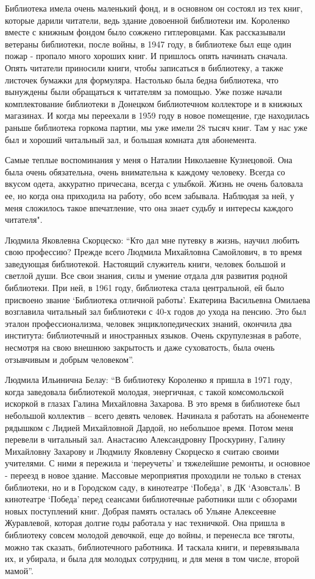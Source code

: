 Библиотека имела очень маленький фонд, и в основном он состоял из тех книг,
которые дарили читатели, ведь здание довоенной библиотеки им. Короленко вместе
с книжным фондом было сожжено гитлеровцами. Как рассказывали ветераны
библиотеки, после войны, в 1947 году, в библиотеке был еще один пожар - пропало
много хо­роших книг. И пришлось  опять начинать сначала. Опять читатели
приносили книги, чтобы записаться в библиотеку, а также листочек бумажки для
формуляра.  Настолько была бедна библиотека, что вынуждены были обращаться к
читателям за помощью. Уже позже начали комплектование библиотеки в Донецком
библиотечном коллекторе и в книжных магазинах. И когда мы переехали в 1959 году
в новое помещение, где находилась раньше библиотека горкома партии, мы уже
имели 28 тысяч книг. Там у нас уже был и хороший читальный зал, и большая
комната для абонемента.

Самые теплые воспоминания у меня о Наталии Николаевне Кузнецовой. Она была
очень обязательна, очень внимательна к каждому человеку. Всегда со вкусом
одета, аккуратно причесана, всегда с улыбкой. Жизнь не очень баловала ее, но
когда она приходила на работу, обо всем забывала. Наблюдая за ней, у меня
сложилось такое впечатление, что она знает судьбу и интересы каждого читателя".

Людмила Яковлевна Скорцеско: \enquote{Кто дал мне путевку в жизнь, научил любить свою
профессию? Прежде всего Людмила Михайловна Самойлович, в то время заведующая
библиотекой. Настоящий служитель книги, чело­век большой и светлой души. Все
свои знания, силы и умение отдала для развития родной библиотеки. При ней, в
1961 году, библиотека стала центральной, ей было присвоено звание \enquote{Библиотека
отличной работы}. Екатерина Васильевна Омилаева возглавила читальный зал
библиотеки с 40-х годов до ухода на пенсию. Это был эталон профессионализма,
человек энциклопедических знаний, окончила два института: библиотечный и
иностранных языков. Очень скрупулезная в работе, несмотря на свою внешнюю
закрытость и даже суховатость, была очень отзывчивым и добрым человеком}.

Людмила Ильинична Белау: \enquote{В библиотеку Короленко я пришла в 1971 году, когда
заведовала библиотекой молодая, энергичная, с такой комсомольской искоркой в
глазах Галина Михайловна Захарова. В это время в библиотеке был небольшой
коллектив – всего девять человек. Начинала я работать на абонементе рядышком с
Лидией Михайловной Дардой, но небольшое время. Потом меня перевели в читальный
зал. Анастасию Александровну Проскурину, Галину Михайловну Захарову и Людмилу
Яковлевну Скорцеско я считаю своими учителями. С ними я пережила и \enquote{переучеты}
и тяжелей­шие ремонты, и основное - переезд в новое здание. Массовые
мероприятия проходили не только в стенах библиотеки, но и в Городском  саду, в
кинотеатре \enquote{Победа}, в ДК \enquote{Азовсталь}. В кинотеатре \enquote{Победа} перед сеансами
библиотечные работники шли с обзорами новых поступлений книг. Добрая память
осталась об  Ульяне Алексеевне Журавлевой, которая долгие годы работала у нас
техничкой. Она пришла в библиотеку совсем молодой девочкой, еще до войны, и
перенесла все тяготы, можно так сказать, библиотечного работника. И таскала
книги, и перевязывала их, и убирала, и была для молодых сотрудниц, и для меня в
том числе, второй мамой}.
